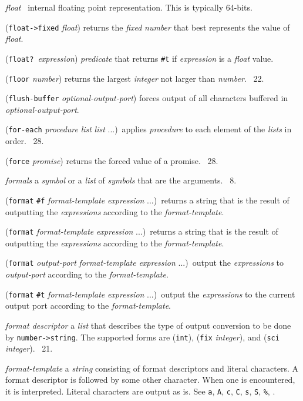 \documentclass[10pt,twocolumn]{article}
\begin{document}
\emph{float} \StoC\ internal floating point representation.  This is
typically 64-bits.

(\texttt{float->fixed} \emph{float}) returns the \emph{fixed}
\emph{number} that best represents the value of \emph{float}.

(\texttt{float?}\ \emph{expression}) \emph{predicate} that returns
\texttt{\#t} if \emph{expression} is a \emph{float} value.

(\texttt{floor} \emph{number}) returns the largest \emph{integer} not
larger than \emph{number}.  \RRRRRS~22.

(\texttt{flush-buffer} \emph{optional-output-port}) forces output of
all characters buffered in \emph{optional-output-port}.

(\texttt{for-each} \emph{procedure} \emph{list} \emph{list}
...)\ applies \emph{procedure} to each element of the \emph{lists} in
order.  \RRRRRS~28.

(\texttt{force} \emph{promise}) returns the forced value of a promise.
\RRRRRS~28.

\emph{formals} a \emph{symbol} or a \emph{list} of \emph{symbols} that
are the arguments.  \RRRRRS~8.

(\texttt{format} \texttt{\#f} \emph{format-template} \emph{expression}
...)\ returns a string that is the result of outputting the
\emph{expressions} according to the \emph{format-template}.

(\texttt{format} \emph{format-template} \emph{expression}
...)\ returns a string that is the result of outputting the
\emph{expressions} according to the \emph{format-template}.

(\texttt{format} \emph{output-port} \emph{format-template}
\emph{expression} ...)\ output the \emph{expressions} to
\emph{output-port} according to the \emph{format-template}.

(\texttt{format} \texttt{\#t} \emph{format-template} \emph{expression}
...)\ output the \emph{expressions} to the current output port
according to the \emph{format-template}.

\emph{format descriptor} a \emph{list} that describes the type of
output conversion to be done by \texttt{number->string}.  The
supported forms are (\texttt{int}), (\texttt{fix} \emph{integer}), and
(\texttt{sci} \emph{integer}).  \RRRRRS~21.

\emph{format-template} a \emph{string} consisting of format
descriptors and literal characters.  A format descriptor is
\texttt{\texttildelow} followed by some other character.  When one is
encountered, it is interpreted.  Literal characters are output as is.
See \texttt{\texttildelow{}a}, \texttt{\texttildelow{}A},
\texttt{\texttildelow{}c}, \texttt{\texttildelow{}C},
\texttt{\texttildelow{}s}, \texttt{\texttildelow{}S},
\texttt{\texttildelow\%}, \texttt{\texttildelow\texttildelow}.
\end{document}

